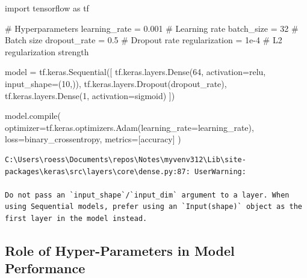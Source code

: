 \documentclass[
  letterpaper,
  DIV=11,
  numbers=noendperiod]{scrreprt}
\newenvironment{Shaded}{\begin{snugshade}}{\end{snugshade}}
\newcommand{\BuiltInTok}[1]{\textcolor[rgb]{0.00,0.23,0.31}{#1}}
\newcommand{\CommentTok}[1]{\textcolor[rgb]{0.37,0.37,0.37}{#1}}
\newcommand{\DecValTok}[1]{\textcolor[rgb]{0.68,0.00,0.00}{#1}}
\newcommand{\FloatTok}[1]{\textcolor[rgb]{0.68,0.00,0.00}{#1}}
\newcommand{\ImportTok}[1]{\textcolor[rgb]{0.00,0.46,0.62}{#1}}
\newcommand{\NormalTok}[1]{\textcolor[rgb]{0.00,0.23,0.31}{#1}}
\newcommand{\OperatorTok}[1]{\textcolor[rgb]{0.37,0.37,0.37}{#1}}
\newcommand{\StringTok}[1]{\textcolor[rgb]{0.13,0.47,0.30}{#1}}
\begin{document}
\begin{Shaded}
\begin{Highlighting}[]
\ImportTok{import}\NormalTok{ tensorflow }\ImportTok{as}\NormalTok{ tf}

\CommentTok{\# Hyperparameters}
\NormalTok{learning\_rate }\OperatorTok{=} \FloatTok{0.001}  \CommentTok{\# Learning rate}
\NormalTok{batch\_size }\OperatorTok{=} \DecValTok{32}        \CommentTok{\# Batch size}
\NormalTok{dropout\_rate }\OperatorTok{=} \FloatTok{0.5}     \CommentTok{\# Dropout rate}
\NormalTok{regularization }\OperatorTok{=} \FloatTok{1e{-}4}  \CommentTok{\# L2 regularization strength}

\NormalTok{model }\OperatorTok{=}\NormalTok{ tf.keras.Sequential([}
\NormalTok{    tf.keras.layers.Dense(}\DecValTok{64}\NormalTok{, activation}\OperatorTok{=}\StringTok{\textquotesingle{}relu\textquotesingle{}}\NormalTok{, input\_shape}\OperatorTok{=}\NormalTok{(}\DecValTok{10}\NormalTok{,)),}
\NormalTok{    tf.keras.layers.Dropout(dropout\_rate),}
\NormalTok{    tf.keras.layers.Dense(}\DecValTok{1}\NormalTok{, activation}\OperatorTok{=}\StringTok{\textquotesingle{}sigmoid\textquotesingle{}}\NormalTok{)}
\NormalTok{])}

\NormalTok{model.}\BuiltInTok{compile}\NormalTok{(}
\NormalTok{    optimizer}\OperatorTok{=}\NormalTok{tf.keras.optimizers.Adam(learning\_rate}\OperatorTok{=}\NormalTok{learning\_rate),}
\NormalTok{    loss}\OperatorTok{=}\StringTok{\textquotesingle{}binary\_crossentropy\textquotesingle{}}\NormalTok{,}
\NormalTok{    metrics}\OperatorTok{=}\NormalTok{[}\StringTok{\textquotesingle{}accuracy\textquotesingle{}}\NormalTok{]}
\NormalTok{)}
\end{Highlighting}
\end{Shaded}

\begin{verbatim}
C:\Users\roess\Documents\repos\Notes\myvenv312\Lib\site-packages\keras\src\layers\core\dense.py:87: UserWarning:

Do not pass an `input_shape`/`input_dim` argument to a layer. When using Sequential models, prefer using an `Input(shape)` object as the first layer in the model instead.
\end{verbatim}

\subsection{Role of Hyper-Parameters in Model
Performance}\label{role-of-hyper-parameters-in-model-performance}
\end{document}
